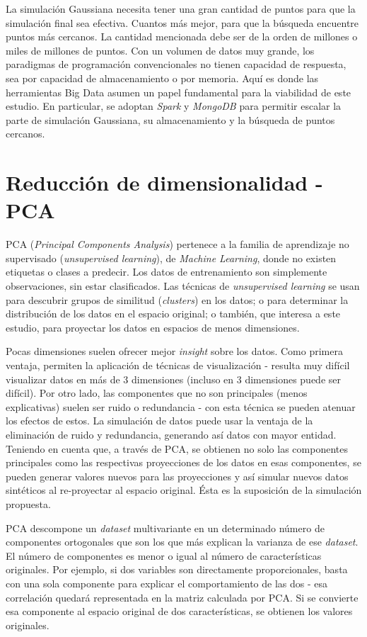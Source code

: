 \documentclass[11pt,spanish,listoffigures,listoftables]{tfgetsinf}
\begin{document}
La simulación Gaussiana necesita tener una gran cantidad de puntos para que la simulación final sea efectiva. Cuantos más mejor, para que la búsqueda encuentre puntos más cercanos. La cantidad mencionada debe ser de la orden de millones o miles de millones de puntos. Con un volumen de datos muy grande, los paradigmas de programación convencionales no tienen capacidad de respuesta, sea por capacidad de almacenamiento o por memoria. Aquí es donde las herramientas Big Data asumen un papel fundamental para la viabilidad de este estudio. En particular, se adoptan {\em Spark} y {\em MongoDB} para permitir escalar la parte de simulación Gaussiana, su almacenamiento y la búsqueda de puntos cercanos.

    \section{Reducción de dimensionalidad - PCA}
    PCA ({\em Principal Components Analysis}) pertenece a la familia de aprendizaje no supervisado ({\em unsupervised learning}), de {\em Machine Learning}, donde no existen etiquetas o clases a predecir. Los datos de entrenamiento son simplemente observaciones, sin estar clasificados. Las técnicas de {\em unsupervised learning} se usan para descubrir grupos de similitud ({\em clusters}) en los datos; o para determinar la distribución de los datos en el espacio original; o también, que interesa a este estudio, para proyectar los datos en espacios de menos dimensiones.

    Pocas dimensiones suelen ofrecer mejor {\em insight} sobre los datos. Como primera ventaja, permiten la aplicación de técnicas de visualización - resulta muy difícil visualizar datos en más de 3 dimensiones (incluso en 3 dimensiones puede ser difícil). Por otro lado, las componentes que no son principales (menos explicativas) suelen ser ruido o redundancia - con esta técnica se pueden atenuar los efectos de estos. La simulación de datos puede usar la ventaja de la eliminación de ruido y redundancia, generando así datos con mayor entidad. Teniendo en cuenta que, a través de PCA, se obtienen no solo las componentes principales como las respectivas proyecciones de los datos en esas componentes, se pueden generar valores nuevos para las proyecciones y así simular nuevos datos sintéticos al re-proyectar al espacio original. Ésta es la suposición de la simulación propuesta.
        
    PCA descompone un {\em dataset} multivariante en un determinado número de componentes ortogonales que son los que más explican la varianza de ese {\em dataset}. El número de componentes es menor o igual al número de características originales. Por ejemplo, si dos variables son directamente proporcionales, basta con una sola componente para explicar el comportamiento de las dos - esa correlación quedará representada en la matriz calculada por PCA. Si se convierte esa componente al espacio original de dos características, se obtienen los valores originales.
    
\end{document}
